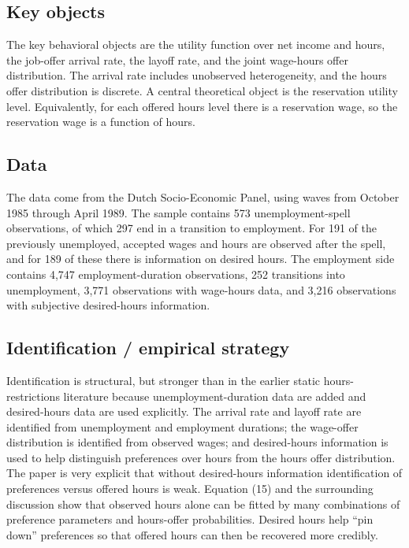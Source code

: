 \documentclass[11pt,a4paper]{article}
\begin{document}
\subsection*{Key objects}
The key behavioral objects are the utility function over net income and hours, the job-offer arrival rate, the layoff rate, and the joint wage-hours offer distribution. The arrival rate includes unobserved heterogeneity, and the hours offer distribution is discrete. A central theoretical object is the reservation utility level. Equivalently, for each offered hours level there is a reservation wage, so the reservation wage is a function of hours.

\subsection*{Data}
The data come from the Dutch Socio-Economic Panel, using waves from October 1985 through April 1989. The sample contains 573 unemployment-spell observations, of which 297 end in a transition to employment. For 191 of the previously unemployed, accepted wages and hours are observed after the spell, and for 189 of these there is information on desired hours. The employment side contains 4,747 employment-duration observations, 252 transitions into unemployment, 3,771 observations with wage-hours data, and 3,216 observations with subjective desired-hours information.

\subsection*{Identification / empirical strategy}
Identification is structural, but stronger than in the earlier static hours-restrictions literature because unemployment-duration data are added and desired-hours data are used explicitly. The arrival rate and layoff rate are identified from unemployment and employment durations; the wage-offer distribution is identified from observed wages; and desired-hours information is used to help distinguish preferences over hours from the hours offer distribution. The paper is very explicit that without desired-hours information identification of preferences versus offered hours is weak. Equation (15) and the surrounding discussion show that observed hours alone can be fitted by many combinations of preference parameters and hours-offer probabilities. Desired hours help “pin down” preferences so that offered hours can then be recovered more credibly.
\end{document}
